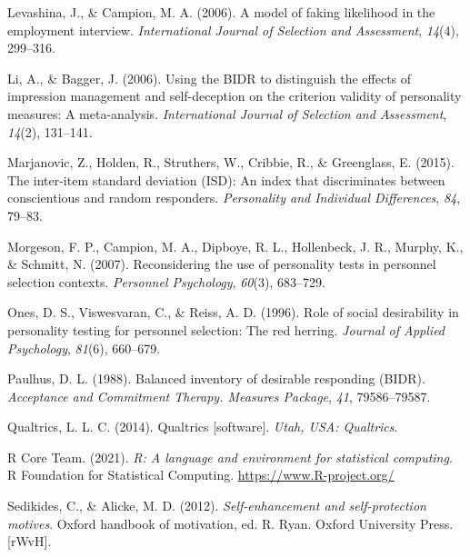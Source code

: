 \documentclass[
  ,jou]{apa6}
\newlength{\cslhangindent}
\newlength{\cslentryspacingunit} %
\newenvironment{CSLReferences}[2] %
 {%
  \setlength{\parindent}{0pt}
  \ifodd #1
  \let\oldpar\par
  \def\par{\hangindent=\cslhangindent\oldpar}
  \fi
  \setlength{\parskip}{#2\cslentryspacingunit}
 }%
 {}
\begin{document}
\begin{CSLReferences}{1}{0}
\leavevmode{}%
Levashina, J., \& Campion, M. A. (2006). A model of faking likelihood in the employment interview. \emph{International Journal of Selection and Assessment}, \emph{14}(4), 299--316.

\leavevmode{}%
Li, A., \& Bagger, J. (2006). Using the {BIDR} to distinguish the effects of impression management and self-deception on the criterion validity of personality measures: A meta-analysis. \emph{International Journal of Selection and Assessment}, \emph{14}(2), 131--141.

\leavevmode{}%
Marjanovic, Z., Holden, R., Struthers, W., Cribbie, R., \& Greenglass, E. (2015). The inter-item standard deviation ({ISD}): An index that discriminates between conscientious and random responders. \emph{Personality and Individual Differences}, \emph{84}, 79--83.

\leavevmode{}%
Morgeson, F. P., Campion, M. A., Dipboye, R. L., Hollenbeck, J. R., Murphy, K., \& Schmitt, N. (2007). Reconsidering the use of personality tests in personnel selection contexts. \emph{Personnel Psychology}, \emph{60}(3), 683--729.

\leavevmode{}%
Ones, D. S., Viswesvaran, C., \& Reiss, A. D. (1996). Role of social desirability in personality testing for personnel selection: The red herring. \emph{Journal of Applied Psychology}, \emph{81}(6), 660--679.

\leavevmode{}%
Paulhus, D. L. (1988). Balanced inventory of desirable responding ({BIDR}). \emph{Acceptance and Commitment Therapy. Measures Package}, \emph{41}, 79586--79587.

\leavevmode{}%
Qualtrics, L. L. C. (2014). Qualtrics {[}software{]}. \emph{Utah, {USA}: Qualtrics}.

\leavevmode{}%
R Core Team. (2021). \emph{R: A language and environment for statistical computing}. R Foundation for Statistical Computing. \url{https://www.R-project.org/}

\leavevmode{}%
Sedikides, C., \& Alicke, M. D. (2012). \emph{Self-enhancement and self-protection motives}. Oxford handbook of motivation, ed. R. Ryan. Oxford University Press.{[}{rWvH}{]}.


\end{CSLReferences}
\end{document}
